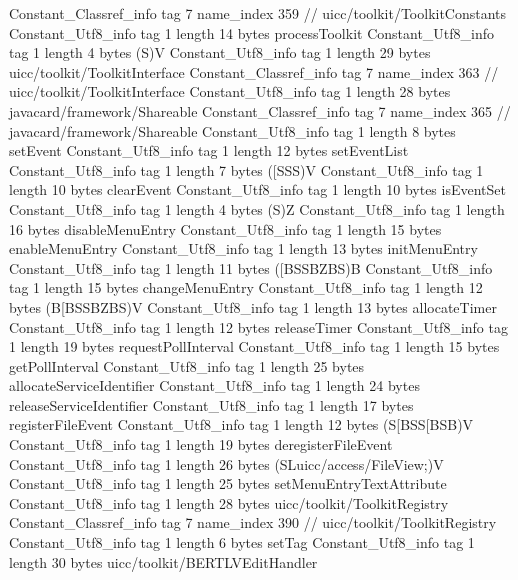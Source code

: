 {{{		}
		Constant_Classref_info {
			tag	7
			name_index	359		// uicc/toolkit/ToolkitConstants
		}
		Constant_Utf8_info {
			tag	1
			length	14
			bytes	processToolkit
		}
		Constant_Utf8_info {
			tag	1
			length	4
			bytes	(S)V
		}
		Constant_Utf8_info {
			tag	1
			length	29
			bytes	uicc/toolkit/ToolkitInterface
		}
		Constant_Classref_info {
			tag	7
			name_index	363		// uicc/toolkit/ToolkitInterface
		}
		Constant_Utf8_info {
			tag	1
			length	28
			bytes	javacard/framework/Shareable
		}
		Constant_Classref_info {
			tag	7
			name_index	365		// javacard/framework/Shareable
		}
		Constant_Utf8_info {
			tag	1
			length	8
			bytes	setEvent
		}
		Constant_Utf8_info {
			tag	1
			length	12
			bytes	setEventList
		}
		Constant_Utf8_info {
			tag	1
			length	7
			bytes	([SSS)V
		}
		Constant_Utf8_info {
			tag	1
			length	10
			bytes	clearEvent
		}
		Constant_Utf8_info {
			tag	1
			length	10
			bytes	isEventSet
		}
		Constant_Utf8_info {
			tag	1
			length	4
			bytes	(S)Z
		}
		Constant_Utf8_info {
			tag	1
			length	16
			bytes	disableMenuEntry
		}
		Constant_Utf8_info {
			tag	1
			length	15
			bytes	enableMenuEntry
		}
		Constant_Utf8_info {
			tag	1
			length	13
			bytes	initMenuEntry
		}
		Constant_Utf8_info {
			tag	1
			length	11
			bytes	([BSSBZBS)B
		}
		Constant_Utf8_info {
			tag	1
			length	15
			bytes	changeMenuEntry
		}
		Constant_Utf8_info {
			tag	1
			length	12
			bytes	(B[BSSBZBS)V
		}
		Constant_Utf8_info {
			tag	1
			length	13
			bytes	allocateTimer
		}
		Constant_Utf8_info {
			tag	1
			length	12
			bytes	releaseTimer
		}
		Constant_Utf8_info {
			tag	1
			length	19
			bytes	requestPollInterval
		}
		Constant_Utf8_info {
			tag	1
			length	15
			bytes	getPollInterval
		}
		Constant_Utf8_info {
			tag	1
			length	25
			bytes	allocateServiceIdentifier
		}
		Constant_Utf8_info {
			tag	1
			length	24
			bytes	releaseServiceIdentifier
		}
		Constant_Utf8_info {
			tag	1
			length	17
			bytes	registerFileEvent
		}
		Constant_Utf8_info {
			tag	1
			length	12
			bytes	(S[BSS[BSB)V
		}
		Constant_Utf8_info {
			tag	1
			length	19
			bytes	deregisterFileEvent
		}
		Constant_Utf8_info {
			tag	1
			length	26
			bytes	(SLuicc/access/FileView;)V
		}
		Constant_Utf8_info {
			tag	1
			length	25
			bytes	setMenuEntryTextAttribute
		}
		Constant_Utf8_info {
			tag	1
			length	28
			bytes	uicc/toolkit/ToolkitRegistry
		}
		Constant_Classref_info {
			tag	7
			name_index	390		// uicc/toolkit/ToolkitRegistry
		}
		Constant_Utf8_info {
			tag	1
			length	6
			bytes	setTag
		}
		Constant_Utf8_info {
			tag	1
			length	30
			bytes	uicc/toolkit/BERTLVEditHandler
}}}
